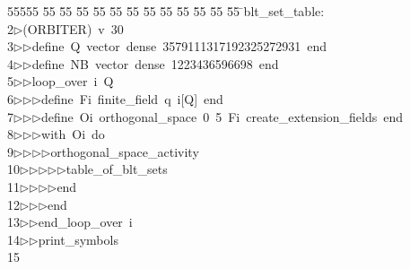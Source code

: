 %
%
\begin{tabbing}
55555 \= 55 \= 55 \= 55 \= 55 \= 55 \= 55 \= 55 \= 55 \= 55 \= 55 \= 55 \= 55 \= \>blt\_set\_table:\ \\[0pt]
2\>$\triangleright$\>(ORBITER)\ v\ 30\ \\[0pt]
3\>$\triangleright$\>$\triangleright$\>define\ Q\ vector\ dense\ 3579111317192325272931\ end\ \\[0pt]
4\>$\triangleright$\>$\triangleright$\>define\ NB\ vector\ dense\ 1223436596698\ end\ \\[0pt]
5\>$\triangleright$\>$\triangleright$\>loop\_over\ i\ Q\ \\[0pt]
6\>$\triangleright$\>$\triangleright$\>$\triangleright$\>define\ Fi\ finite\_field\ q\ i[Q]\ end\ \\[0pt]
7\>$\triangleright$\>$\triangleright$\>$\triangleright$\>define\ Oi\ orthogonal\_space\ 0\ 5\ Fi\ create\_extension\_fields\ end\ \\[0pt]
8\>$\triangleright$\>$\triangleright$\>$\triangleright$\>with\ Oi\ do\ \\[0pt]
9\>$\triangleright$\>$\triangleright$\>$\triangleright$\>$\triangleright$\>orthogonal\_space\_activity\ \\[0pt]
10\>$\triangleright$\>$\triangleright$\>$\triangleright$\>$\triangleright$\>$\triangleright$\>table\_of\_blt\_sets\ \\[0pt]
11\>$\triangleright$\>$\triangleright$\>$\triangleright$\>$\triangleright$\>end\ \\[0pt]
12\>$\triangleright$\>$\triangleright$\>$\triangleright$\>end\ \\[0pt]
13\>$\triangleright$\>$\triangleright$\>end\_loop\_over\ i\ \\[0pt]
14\>$\triangleright$\>$\triangleright$\>print\_symbols\\[0pt]
15\>\end{tabbing}

